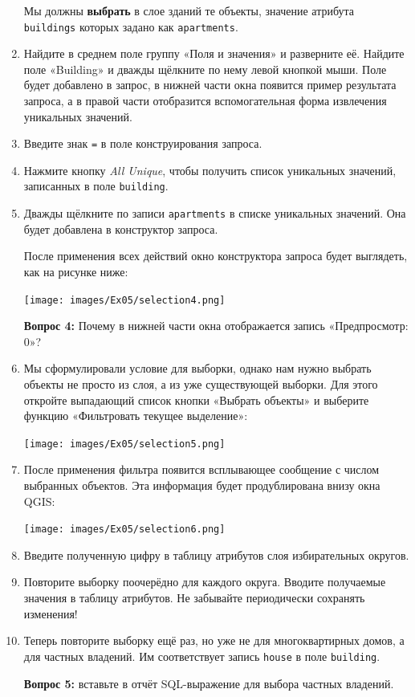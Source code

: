 \documentclass[
  12pt,
]{book}
\begin{document}
\begin{enumerate}
  Мы должны \textbf{выбрать} в слое зданий те объекты, значение атрибута \texttt{buildings} которых задано как \texttt{apartments}.
\item
  Найдите в среднем поле группу «Поля и значения» и разверните её. Найдите поле «Building» и дважды щёлкните по нему левой кнопкой мыши. Поле будет добавлено в запрос, в нижней части окна появится пример результата запроса, а в правой части отобразится вспомогательная форма извлечения уникальных значений.
\item
  Введите знак \texttt{=} в поле конструирования запроса.
\item
  Нажмите кнопку \emph{All Unique}, чтобы получить список уникальных значений, записанных в поле \texttt{building}.
\item
  Дважды щёлкните по записи \texttt{apartments} в списке уникальных значений. Она будет добавлена в конструктор запроса.

  После применения всех действий окно конструктора запроса будет выглядеть, как на рисунке ниже:

  \texttt{[image: images/Ex05/selection4.png]}

  \textbf{Вопрос 4:} Почему в нижней части окна отображается запись «Предпросмотр: 0»?
\item
  Мы сформулировали условие для выборки, однако нам нужно выбрать объекты не просто из слоя, а из уже существующей выборки. Для этого откройте выпадающий список кнопки «Выбрать объекты» и выберите функцию «Фильтровать текущее выделение»:

  \texttt{[image: images/Ex05/selection5.png]}
\item
  После применения фильтра появится всплывающее сообщение с числом выбранных объектов. Эта информация будет продублирована внизу окна QGIS:

  \texttt{[image: images/Ex05/selection6.png]}
\item
  Введите полученную цифру в таблицу атрибутов слоя избирательных округов.
\item
  Повторите выборку поочерёдно для каждого округа. Вводите получаемые значения в таблицу атрибутов. Не забывайте периодически сохранять изменения!
\item
  Теперь повторите выборку ещё раз, но уже не для многоквартирных домов, а для частных владений. Им соответствует запись \texttt{house} в поле \texttt{building}.

  \textbf{Вопрос 5:} вставьте в отчёт SQL-выражение для выбора частных владений.


\end{enumerate}
\end{document}
